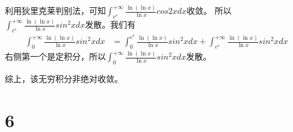 \documentclass{article}
\begin{document}
\begin{itemize}
        利用狄里克莱判别法，可知$\int_{e^e}^{+\infty} \frac{\ln(\ln x)}{\ln x} cos2x dx$收敛。
        所以$\int_{e^e}^{+\infty} \frac{\ln(\ln x)}{\ln x} sin^2 x dx$发散。我们有
        \begin{align*}
          \int_{0}^{+\infty} \frac{\ln(\ln x)}{\ln x} sin^2 x dx
           & = \int_{0}^{e^e} \frac{\ln(\ln x)}{\ln x} sin^2 x dx + \int_{e^e}^{+\infty} \frac{\ln(\ln x)}{\ln x} sin^2 x dx
        \end{align*}
        右侧第一个是定积分，所以$\int_{0}^{+\infty} \frac{\ln(\ln x)}{\ln x} sin^2 x dx$发散。

        综上，该无穷积分非绝对收敛。

\end{itemize}

\section*{6}
\end{document}
